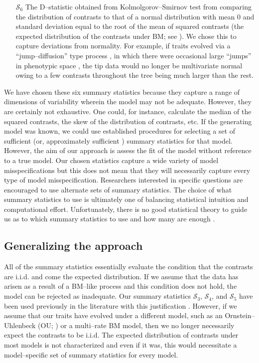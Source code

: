 \documentclass[a4paper,12pt]{article}
\begin{document}
\begin{enumerate}
\item[$\mathcal{S}_6$] The D--statistic obtained from Kolmolgorov--Smirnov test from comparing the distribution of contrasts to that of a normal distribution with mean 0 and standard deviation equal to the root of the mean of squared contrasts (the expected distribution of the contrasts under BM; see \citep{Felsenstein1985, Rohlf2001}). We chose this to capture deviations from normality. For example, if traits evolved via a ``jump--diffusion'' type process \citep{Landis2012}, in which there were occasional large ``jumps'' in phenotypic space \citep{PennellPE}, the tip data would no longer be multivariate normal owing to a few contrasts throughout the tree being much larger than the rest. 

\end{enumerate}

We have chosen these six summary statistics because they capture a range of dimensions of variability wherein the model may not be adequate. However, they are certainly not exhaustive. One could, for instance, calculate the median of the squared contrasts, the skew of the distribution of contrasts, etc. If the generating model was known, we could use established procedures for selecting a set of sufficient (or, approximately sufficient \citep{MajoramJoyce}) summary statistics for that model. However, the aim of our approach is assess the fit of the model without reference to a true model. Our chosen statistics capture a wide variety of model misspecifications but this does not mean that they will necessarily capture every type of model misspecification. Researchers interested in specific questions are encouraged to use alternate sets of summary statistics. The choice of what summary statistics to use is ultimately one of balancing statistical intuition and computational effort. Unfortunately, there is no good statistical theory to guide us as to which summary statistics to use and how many are enough \citep{Gelmanbook}.

\subsection*{Generalizing the approach}

All of the summary statistics essentially evaluate the condition that the contrasts are i.i.d. and come the expected distribution. If we assume that the data has arisen as a result of a BM--like process and this condition does not hold, the model can be rejected as inadequate. Our summary statistics $\mathcal{S}_3$, $\mathcal{S}_4$, and $\mathcal{S}_5$ have been used previously in the literature with this justification \citep{Garland1992, Garland1993,  Diaz1996}. However, if we assume that our traits have evolved under a different model, such as an Ornstein--Uhlenbeck (OU; \citep{Hansen1997}) or a multi--rate BM model, then we no longer necessarily expect the contrasts to be i.i.d. The expected distribution of contrasts under most models is not characterized and even if it was, this would necessitate a model--specific set of summary statistics for every model.
\end{document}
